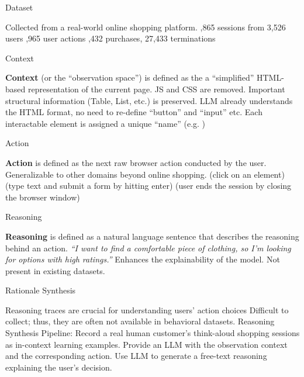 \documentclass[scheme=plain,aspectratio=169]{beamer}
\begin{document}
\begin{frame}{Dataset}
  \begin{outline}
    \1 Collected from a real-world online shopping platform.
    ,865 sessions from 3,526 users
    ,965 user actions
    ,432 purchases, 27,433 terminations
  \end{outline}
\end{frame}

\begin{frame}{Context}
  \begin{outline}
    \1 \textbf{Context} (or the ``observation space'') is defined as the a ``simplified'' HTML-based representation of the current page.
    \1 JS and CSS are removed.
    \1 Important structural information (Table, List, etc.) is preserved.
    \1 LLM already understands the HTML format, no need to re-define ``button'' and ``input'' etc.
    \pause
    \1 Each interactable element is assigned a unique ``name'' (e.g. )
  \end{outline}
\end{frame}
\begin{frame}{Action}
  \begin{outline}
    \1 \textbf{Action} is defined as the next raw browser action conducted by the user.
      \2 Generalizable to other domains beyond online shopping.
    \1  (click on an element)
    \1  (type text and submit a form by hitting enter)
    \1  (user ends the session by closing the browser window)
  \end{outline}
\end{frame}


\begin{frame}{Reasoning}
  \begin{outline}
    \1 \textbf{Reasoning} is defined as a natural language sentence that describes the reasoning behind an action.
      \2 \textit{``I want to find a comfortable piece of clothing, so I’m looking for options with high ratings.''}
    \1 Enhances the explainability of the model.
    \1 Not present in existing datasets.
  \end{outline}
  
\end{frame}

\begin{frame}{Rationale Synthesis}



  \begin{outline}
    \1 Reasoning traces are crucial for understanding users' action choices
    \1 Difficult to collect; thus, they are often not available in behavioral datasets.
    \1 Reasoning Synthesis Pipeline:
      \2 Record a real human customer's think-aloud shopping sessions as in-context learning examples.
      \2 Provide an LLM with the observation context and the corresponding action.
      \2 Use LLM to generate a free-text reasoning explaining the user's decision.
  \end{outline}  
\end{frame}
\end{document}
